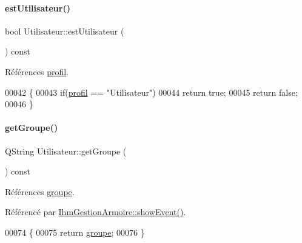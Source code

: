 \paragraph{\texorpdfstring{est\+Utilisateur()}{estUtilisateur()}}
{\footnotesize\ttfamily bool Utilisateur\+::est\+Utilisateur (\begin{DoxyParamCaption}{ }\end{DoxyParamCaption}) const}



Références \hyperlink{class_utilisateur_ab03707f32fadf99ae0a0a27d59470646}{profil}.


\begin{DoxyCode}
00042 \{
00043     \textcolor{keywordflow}{if}(\hyperlink{class_utilisateur_ab03707f32fadf99ae0a0a27d59470646}{profil} == \textcolor{stringliteral}{"Utilisateur"})
00044         \textcolor{keywordflow}{return} \textcolor{keyword}{true};
00045     \textcolor{keywordflow}{return} \textcolor{keyword}{false};
00046 \}
\end{DoxyCode}
\mbox{\label{class_utilisateur_a9922d48c4d295c9357ad8102399322ec}} 
\paragraph{\texorpdfstring{get\+Groupe()}{getGroupe()}}
{\footnotesize\ttfamily Q\+String Utilisateur\+::get\+Groupe (\begin{DoxyParamCaption}{ }\end{DoxyParamCaption}) const}



Références \hyperlink{class_utilisateur_af795d9518a4eebe00c5b24937732ab2b}{groupe}.



Référencé par \hyperlink{class_ihm_gestion_armoire_ad0f3d63f9b93fc902de40a9a546f709c}{Ihm\+Gestion\+Armoire\+::show\+Event()}.


\begin{DoxyCode}
00074 \{
00075     \textcolor{keywordflow}{return} \hyperlink{class_utilisateur_af795d9518a4eebe00c5b24937732ab2b}{groupe};
00076 \}
\end{DoxyCode}
\mbox{\label{class_utilisateur_a12d3730085761780dd54ffbcf4741721}} 
